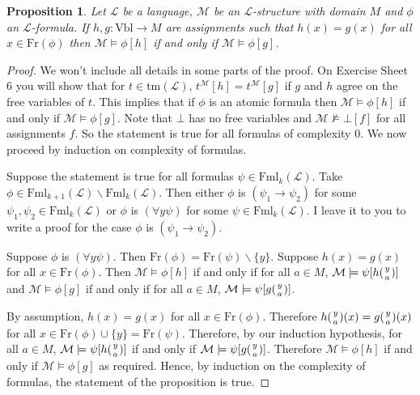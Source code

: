 \documentclass[11pt]{article}
\newcommand{\tm}{\textrm{tm}}
\newcommand{\Fml}{\textrm{Fml}}
\newcommand{\Fr}{\textrm{Fr}}
\newcommand{\Vbl}{\textrm{Vbl}}
\newtheorem{proposition}[theorem]{Proposition}
\newcommand{\mcal}[1]{\mathcal{#1}}
\begin{document}
\begin{proposition}\label{Onlyfrvarcount}
Let $\mcal{L}$ be a language, $\mcal{M}$ be an $\mcal{L}$-structure with domain $M$ and $\phi$ an $\mcal{L}$-formula. If $h,g:\Vbl\rightarrow M$ are assignments such that $h(x)=g(x)$ for all $x\in \Fr(\phi)$ then $\mcal{M}\models \phi[h]$ if and only if $\mcal{M}\models\phi[g]$.
\end{proposition}
\begin{proof}
We won't include all details in some parts of the proof. On Exercise Sheet $6$ you will show that for $t\in\tm(\mcal{L})$, $t^\mcal{M}[h]=t^{\mcal{M}}[g]$ if $g$ and $h$ agree on the free variables of $t$. This implies that if $\phi$ is an atomic formula then $\mcal{M}\models \phi[h]$ if and only if $\mcal{M}\models\phi[g]$. Note that $\bot$ has no free variables and $\mcal{M}\nvDash \bot[f]$ for all assignments $f$. So the statement is true for all formulas of complexity $0$. We now proceed by induction on complexity of formulas.

Suppose the statement is true for all formulas $\psi\in \Fml_k(\mcal{L})$. Take $\phi\in \Fml_{k+1}(\mcal{L})\backslash \Fml_k(\mcal{L})$. Then either $\phi$ is $(\psi_1\rightarrow \psi_2)$ for some $\psi_1,\psi_2\in \Fml_k(\mcal{L})$ or $\phi$ is $(\forall y\psi)$ for some $\psi \in \Fml_k(\mcal{L})$. I leave it to you to write a proof for the case $\phi$ is $(\psi_1\rightarrow \psi_2)$.

Suppose $\phi$ is $(\forall y\psi)$. Then $\Fr(\phi)=\Fr(\psi)\backslash\{y\}$. Suppose $h(x)=g(x)$ for all $x\in \Fr(\phi)$. Then
$\mcal{M}\models \phi[h]$ if and only if for all $a\in M$, $\mcal{M}\models \psi[h({y\atop a})]$
and
$\mcal{M}\models \phi[g]$ if and only if for all $a\in M$, $\mcal{M}\models \psi[g({y\atop a})]$.

By assumption,  $h(x)=g(x)$ for all $x\in \Fr(\phi)$. Therefore $h({y\atop a})(x)=g({y\atop a})(x)$ for all $x\in \Fr(\phi)\cup\{y\}=\Fr(\psi)$. Therefore, by our induction hypothesis, for all $a\in M$, $\mcal{M}\models \psi[h({y\atop a})]$ if and only if $\mcal{M}\models \psi[g({y\atop a})]$. Therefore $\mcal{M}\models \phi[h]$ if and only if $\mcal{M}\models \phi[g]$ as required. Hence, by induction on the complexity of formulas, the statement of the proposition is true.
\end{proof}

\goodbreak
\end{document}
